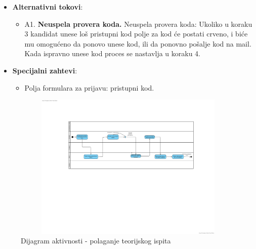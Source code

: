\begin{itemize}
  \item \textbf{Alternativni tokovi}:
      \begin{itemize}
        \item A1. \textbf{Neuspela provera koda.}
        Neuspela provera koda: Ukoliko u koraku 3 kandidat unese loš pristupni kod polje za kod će postati crveno,
         i biće mu omogućeno da ponovo unese kod, ili da ponovno pošalje kod na mail. Kada ispravno unese kod proces se nastavlja u koraku 4.
      \end{itemize}
      
  \item \textbf{Specijalni zahtevi}:
      \begin{itemize}
        \item Polja formulara za prijavu: pristupni kod. 
      \end{itemize}
\end{itemize}

\begin{figure}[H]
  \begin{center}
      \includegraphics[width=140mm, height=70mm]{Diagrams/polaganje teorijskog ispita.png}
  \end{center}
  \caption {Dijagram aktivnosti - polaganje teorijskog ispita}
  \label{activity_polaganje_teorije}

\end{figure}
